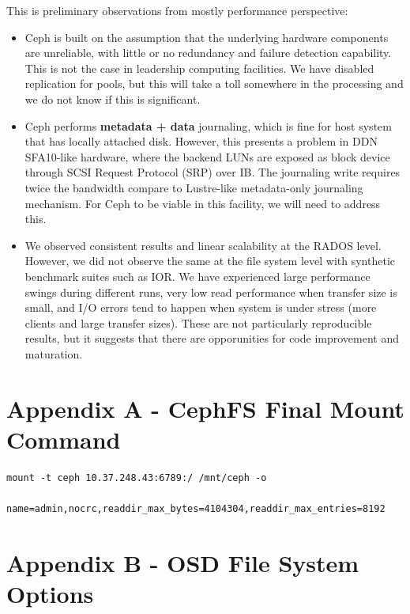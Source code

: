 \documentclass{article}
\begin{document}
This is preliminary observations from mostly performance perspective:

\begin{itemize}

  \item Ceph is built on the assumption that the underlying hardware components
  are unreliable, with little or no redundancy and failure detection capability.
  This is not the case in leadership computing facilities. We have disabled
  replication for pools, but this will take a toll somewhere in the processing
  and we do not know if this is significant.

  \item Ceph performs \textbf{metadata + data} journaling, which is fine for host
  system that has locally attached disk. However, this presents a problem in DDN
  SFA10-like hardware, where the backend LUNs are exposed as block device
  through SCSI Request Protocol (SRP) over IB. The journaling write requires twice the bandwidth
  compare to Lustre-like metadata-only journaling mechanism. For Ceph to be
  viable in this facility, we will need to address this.

  \item We observed consistent results and linear scalability at the
  RADOS level. However, we did not observe the same at the file system level with synthetic
  benchmark suites such as IOR. We have experienced large performance swings
  during different runs, very low read performance when transfer size is small,
  and I/O errors tend to happen when system is under stress (more clients and
  large transfer sizes). These are not particularly reproducible results, but it
  suggests that there are opporunities for code improvement and maturation.

\end{itemize}

\section*{Appendix A - CephFS Final Mount Command}

\begin{Verbatim}
mount -t ceph 10.37.248.43:6789:/ /mnt/ceph -o
      name=admin,nocrc,readdir_max_bytes=4104304,readdir_max_entries=8192
\end{Verbatim}


\section*{Appendix B - OSD File System Options}
\end{document}
